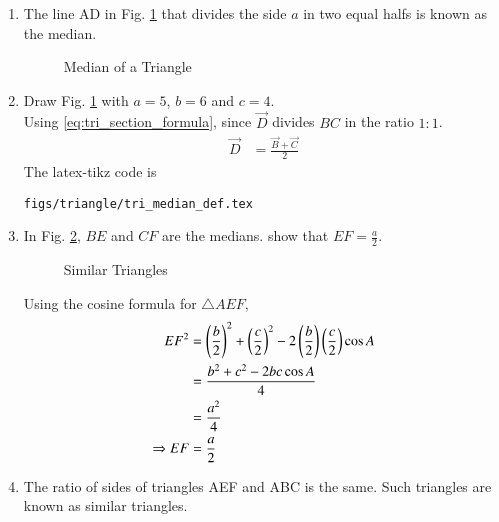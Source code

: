 %
\renewcommand{\theequation}{\theenumi}
\begin{enumerate}[label=\arabic*.,ref=\thesubsection.\theenumi]

\item	The line AD in Fig. \ref{fig:tri_median_def} that divides the side $a$ in two equal halfs is known as the median.

\begin{figure}[!ht]
	\begin{center}
	\resizebox{\columnwidth}{!}{}
	\end{center}
	\caption{Median of a Triangle}
	\label{fig:tri_median_def}	
\end{figure}
%
\item Draw Fig. \ref{fig:tri_median_def} with $a=5$, $b=6$  and $c=4$.  
\label{const:tri_median_def}
%
\\
\solution Using \eqref{eq:tri_section_formula}, since $\vec{D}$ divides $BC$ in the ratio $1:1$.
\begin{align}
\vec{D} &= \frac{\vec{B} + \vec{C}}{2}  
\end{align}
%
The  latex-tikz code is
%
\begin{lstlisting}
figs/triangle/tri_median_def.tex
\end{lstlisting}
%

\item
	In Fig. \ref{fig:tri_med_sim}, $BE$ and $CF$ are the medians.  show that $EF = \frac{a}{2}$.  

%
\begin{figure}[!ht]
	\begin{center}
		\resizebox{\columnwidth}{!}{}
	\end{center}
	\caption{Similar Triangles}
	\label{fig:tri_med_sim}	
\end{figure}

\solution Using the cosine formula for $\triangle AEF$,
%
\begin{align}
EF^2 &= \left(\frac{b}{2}\right)^2 + \left(\frac{c}{2}\right)^2 - 2 \left(\frac{b}{2}\right)\left(\frac{c}{2}\right) \cos A \\
&= \frac{b^2 + c^2 - 2bc \cos A}{4} \\
&= \frac{a^2}{4} \\
\Rightarrow EF &= \frac{a}{2}
\end{align}
%

\item
	The ratio of sides of triangles AEF and ABC is the same.  Such triangles are known as similar triangles.


\end{enumerate}
